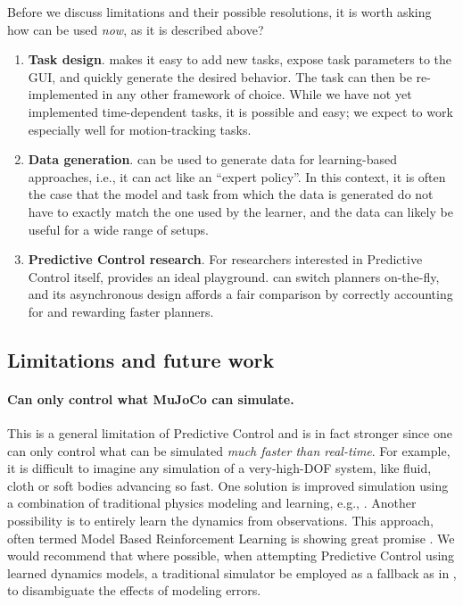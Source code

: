 Before we discuss limitations and their possible resolutions, it is worth asking how can \app{} be used \emph{now}, as it is described above?
\begin{enumerate}
	\item \textbf{Task design}. \app{} makes it easy to add new tasks, expose task parameters to the GUI, and quickly generate the desired behavior. The task can then be re-implemented in any other framework of choice. While we have not yet implemented time-dependent tasks, it is possible and easy; we expect \app{} to work especially well for motion-tracking tasks.
	\item \textbf{Data generation}. \app{} can be used to generate data for learning-based approaches, i.e., it can act like an ``expert policy''. In this context, it is often the case that the model and task from which the data is generated do not have to exactly match the one used by the learner, and the data can likely be useful for a wide range of setups.
	\item \textbf{Predictive Control research}. For researchers interested in Predictive Control itself, \app{} provides an ideal playground. \app{} can switch planners on-the-fly, and its asynchronous design affords a fair comparison by correctly accounting for and rewarding faster planners.
\end{enumerate}

\subsection{Limitations and future work} \label{ps_future_work}

\paragraph{Can only control what MuJoCo can simulate.} This is a general limitation of Predictive Control and is in fact stronger since one can only control what can be simulated \emph{much faster than real-time}. For example, it is difficult to imagine any simulation of a very-high-DOF system, like fluid, cloth or soft bodies advancing so fast. One solution is improved simulation using a combination of traditional physics modeling and learning, e.g., \cite{ladicky2017physics}. Another possibility is to entirely learn the dynamics from observations. This approach, often termed Model Based Reinforcement Learning is showing great promise \cite{heess2015learning, nagabandi2020deep, wu2022daydreamer}. We would recommend that where possible, when attempting Predictive Control using learned dynamics models, a traditional simulator be employed as a fallback as in \cite{schrittwieser2020mastering}, to disambiguate the effects of modeling errors. 


